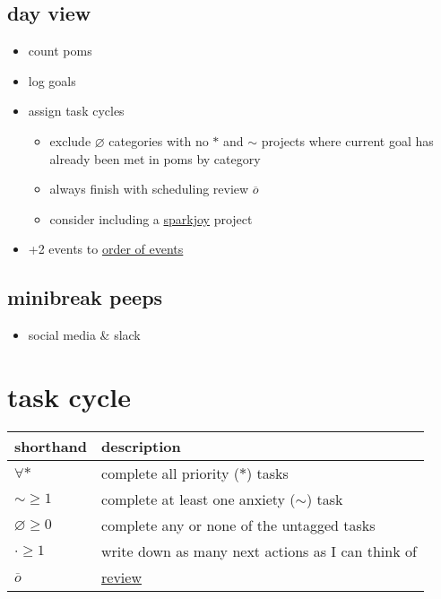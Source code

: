 \documentclass[]{book}
\providecommand{\tightlist}{%
  \setlength{\itemsep}{0pt}\setlength{\parskip}{0pt}}
\begin{document}
\hypertarget{day-view-1}{%
\subsection{day view}\label{day-view-1}}

\begin{itemize}
\tightlist
\item
  count poms
\item
  log goals
\item
  assign task cycles

  \begin{itemize}
  \tightlist
  \item
    exclude \(\varnothing\) categories with no \(*\) and \(\sim\) projects where current goal has already been met in poms by category
  \item
    always finish with scheduling review \(\overline o\)
  \item
    consider including a \href{https://en.wikipedia.org/wiki/Marie_Kondo}{sparkjoy} project
  \end{itemize}
\item
  +2 events to \protect\hyperlink{order-of-events}{order of events}
\end{itemize}

\hypertarget{minibreak-peeps}{%
\subsection{minibreak peeps}\label{minibreak-peeps}}

\begin{itemize}
\tightlist
\item
  social media \& slack
\end{itemize}

\hypertarget{task-cycle}{%
\section{task cycle}\label{task-cycle}}

\begin{longtable}[]{@{}ll@{}}
\toprule
shorthand & description\tabularnewline
\midrule
\endhead
\(\forall *\) & complete all priority (\(*\)) tasks\tabularnewline
\(\sim \geqslant 1\) & complete at least one anxiety (\(\sim\)) task\tabularnewline
\(\varnothing \geqslant 0\) & complete any or none of the untagged tasks\tabularnewline
\(\cdot \geqslant 1\) & write down as many next actions as I can think of\tabularnewline
\(\overline o\) & \protect\hyperlink{review}{review}\tabularnewline
\bottomrule
\end{longtable}
\end{document}
